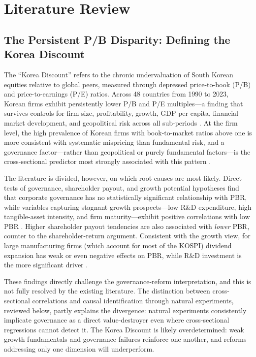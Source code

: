 \section{Literature Review}

\subsection{The Persistent P/B Disparity: Defining the Korea Discount}
The ``Korea Discount'' refers to the chronic undervaluation of South Korean equities relative to global peers, measured through depressed price-to-book (P/B) and price-to-earnings (P/E) ratios. Across 48 countries from 1990 to 2023, Korean firms exhibit persistently lower P/B and P/E multiples---a finding that survives controls for firm size, profitability, growth, GDP per capita, financial market development, and geopolitical risk across all sub-periods \citep{kim_korean_market_longterm}. At the firm level, the high prevalence of Korean firms with book-to-market ratios above one is more consistent with systematic mispricing than fundamental risk, and a governance factor---rather than geopolitical or purely fundamental factors---is the cross-sectional predictor most strongly associated with this pattern \citep{jung_korea_discount_book_to_market}.

The literature is divided, however, on which root causes are most likely. Direct tests of governance, shareholder payout, and growth potential hypotheses find that corporate governance has no statistically significant relationship with PBR, while variables capturing stagnant growth prospects---low R\&D expenditure, high tangible-asset intensity, and firm maturity---exhibit positive correlations with low PBR \citep{yang_korea_discount_growth_vs_governance}. Higher shareholder payout tendencies are also associated with \emph{lower} PBR, counter to the shareholder-return argument. Consistent with the growth view, for large manufacturing firms (which account for most of the KOSPI) dividend expansion has weak or even negative effects on PBR, while R\&D investment is the more significant driver \citep{lee_korea_discount_pbr}.

These findings directly challenge the governance-reform interpretation, and this is not fully resolved by the existing literature. The distinction between cross-sectional correlations and causal identification through natural experiments, reviewed below, partly explains the divergence: natural experiments consistently implicate governance as a direct value-destroyer even where cross-sectional regressions cannot detect it. The Korea Discount is likely overdetermined: weak growth fundamentals and governance failures reinforce one another, and reforms addressing only one dimension will underperform.

